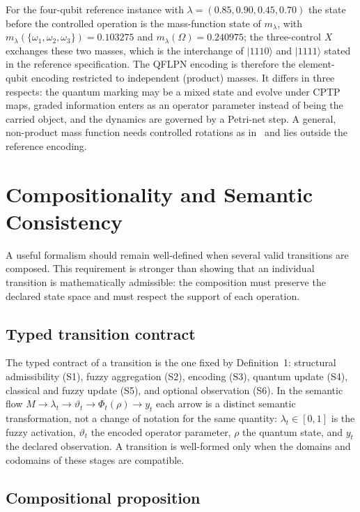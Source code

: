\documentclass[final,3p,times]{elsarticle}
\begin{document}
For the four-qubit reference instance with $\lambda=(0.85,0.90,0.45,0.70)$ the state before the controlled operation is the mass-function state of $m_\lambda$, with $m_\lambda(\{\omega_1,\omega_2,\omega_3\})=0.103275$ and $m_\lambda(\Omega)=0.240975$; the three-control $X$ exchanges these two masses, which is the interchange of $|1110\rangle$ and $|1111\rangle$ stated in the reference specification. The QFLPN encoding is therefore the element-qubit encoding restricted to independent (product) masses. It differs in three respects: the quantum marking may be a mixed state and evolve under CPTP maps, graded information enters as an operator parameter instead of being the carried object, and the dynamics are governed by a Petri-net step. A general, non-product mass function needs controlled rotations as in~\cite{refZhouBFQC} and lies outside the reference encoding.

\section{Compositionality and Semantic Consistency}

A useful formalism should remain well-defined when several valid transitions are composed. This requirement is stronger than showing that an individual transition is mathematically admissible: the composition must preserve the declared state space and must respect the support of each operation.

\subsection{Typed transition contract}

The typed contract of a transition is the one fixed by Definition~1: structural admissibility (S1), fuzzy aggregation (S2), encoding (S3), quantum update (S4), classical and fuzzy update (S5), and optional observation (S6). In the semantic flow $M\rightarrow\lambda_t\rightarrow\vartheta_t\rightarrow\Phi_t(\rho)\rightarrow y_t$ each arrow is a distinct semantic transformation, not a change of notation for the same quantity: $\lambda_t\in[0,1]$ is the fuzzy activation, $\vartheta_t$ the encoded operator parameter, $\rho$ the quantum state, and $y_t$ the declared observation. A transition is well-formed only when the domains and codomains of these stages are compatible.

\subsection{Compositional proposition}
\end{document}
